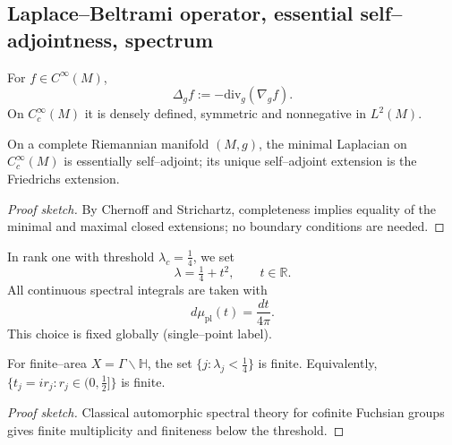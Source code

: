 \subsection{Laplace–Beltrami operator, essential self–adjointness, spectrum}\relax \hspace{0pt}
\label{subsec:laplacian-esa}
\begin{definition}\relax
For $f\in C^{\infty}(M)$,
\[
  \Delta_g f := -\mathrm{div}_g(\nabla_g f).
\]
On $C_c^\infty(M)$ it is densely defined, symmetric and nonnegative in $L^2(M)$. %
\end{definition}

\begin{lemma}\label{lem:esa}\relax
On a complete Riemannian manifold $(M,g)$, the minimal Laplacian on $C_c^\infty(M)$ is essentially self–adjoint; its unique self–adjoint extension is the Friedrichs extension. %
\end{lemma}

\begin{proof}[Proof sketch]\relax
By Chernoff and Strichartz, completeness implies equality of the minimal and maximal closed extensions; no boundary conditions are needed. %
\end{proof}

\begin{definition}\label{def:param-measure}\relax
In rank one with threshold $\lambda_c=\tfrac14$, we set
\[
  \lambda=\tfrac14+t^2,\qquad t\in\mathbb{R}.
\]
All continuous spectral integrals are taken with
\[
  d\mu_{\mathrm{pl}}(t)=\frac{dt}{4\pi}.
\]
This choice is fixed globally (single–point label). %
\end{definition}

\begin{proposition}\label{prop:small-finite}\relax
For finite–area $X=\Gamma\backslash\mathbb{H}$, the set $\{j:\lambda_j<\tfrac14\}$ is finite. Equivalently, $\{t_j=i r_j: r_j\in(0,\tfrac12]\}$ is finite. %
\end{proposition}

\begin{proof}[Proof sketch]\relax
Classical automorphic spectral theory for cofinite Fuchsian groups gives finite multiplicity and finiteness below the threshold. %
\end{proof}

